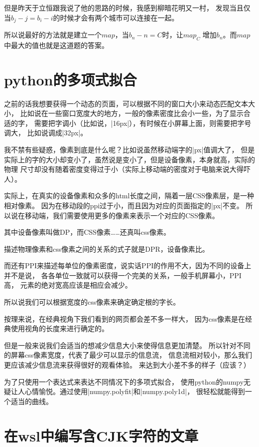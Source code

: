 但是昨天于立恒跟我说了他的思路的时候，我感到柳暗花明又一村，
发现当且仅当$b_j-j=b_i-i$的时候才会有两个城市可以连接在一起。

所以说最好的方法就是建立一个$map$，当$b_n-n=C$时，让$map_C$
增加$b_n$。而$map$中最大的值也就是这道题的答案。


\section{python的多项式拟合}

之前的话我想要获得一个动态的页面，可以根据不同的窗口大小来动态匹配文本大小，
比如说在一些窗口宽度大的地方，一般的像素密度比会小一些，为了显示合适的字，
需要把字调小（比如说，\vb|16px|），有时候在小屏幕上面，则需要把字号调大，
比如说调成\vb|32px|。

我不禁有些疑惑，像素到底是什么呢？比如说虽然移动端字的\vb|px|值调大了，
但是实际上的字的大小却变小了，虽然说是变小了，但是设备像素，本身就高，实际的物理
尺寸却没有随着密度变得过于小（实际上移动端的密度对于电脑来说大得吓人）。

实际上，在真实的设备像素和众多的html长度之间，隔着一层CSS像素层，是一种相对像素。
因为在移动段的ppi过于小，而且因为对应的页面指定的\vb|px|不变。
所以说在移动端，我们需要使用更多的像素来表示一个对应的CSS像素。

其中设备像素叫做DP，而CSS像素\ldots\ldots 还真叫css像素。

描述物理像素和css像素之间的关系的式子就是DPR，设备像素比。

而还有PPI来描述每单位的像素密度，说实话PPI的作用不大，因为不同的设备上并不是说，
各各单位一致就可以获得一个完美的关系，一般手机屏幕小，PPI高，
元素的绝对宽高应该是相应会减少。

所以说我们可以根据宽度的css像素来确定确定根的字长。

按理来说，在经典视角下我们看到的网页都会差不多一样大，
因为css像素是在经典使用视角的长度来进行确定的。

但是一般来说我们会适当的想减少信息大小来使得信息更加清楚。
所以针对不同的屏幕css像素宽度，代表了最少可以显示的信息流，
信息流相对较小，那么我们更应该减少信息流来获得很好的观看体验。
来达到大小差不多的样子（应该？）

为了只使用一个表达式来表达不同情况下的多项式拟合，
使用python的numpy无疑让人心情愉悦。通过使用\vb|numpy.polyfit|和\vb|numpy.poly1d|，
很轻松就能得到一个适当的曲线。


\section{在wsl中编写含CJK字符的文章}

